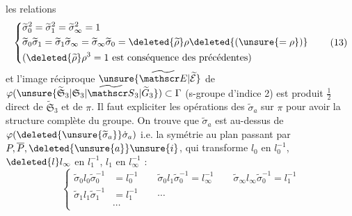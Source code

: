 les relations
\[
\left\{\begin{aligned}
&\widetilde\sigma_0^2=\widetilde\sigma_1^2=\widetilde\sigma_\infty^2=1\\
&\widetilde\sigma_0\widetilde\sigma_1=\widetilde\sigma_1\widetilde\sigma_\infty=\widetilde\sigma_\infty\widetilde\sigma_0=\deleted{\widetilde\rho}\rho\deleted{(\unsure{=\rho})}\\
&(\deleted{\widetilde\rho}\rho^3=1\text{ est conséquence des précédentes})
\end{aligned}\right.\tag*{(13)}
\]
et l'image réciproque $\unsure{\widetilde{\mathscr E}|\widetilde{\mathcal E}}$ de $\varphi(\unsure{\widetilde{\mathfrak S}_3|\mathfrak S_3|\widetilde{\mathscr S}_3|\widetilde G_3})\subset\Gamma$ (s-groupe d'indice 2) est produit $\frac12$ direct de $\widetilde{\mathfrak S}_3$ et de $\pi$. Il faut expliciter les opérations des $\widetilde\sigma_a$ sur $\pi$ pour avoir la structure complète du groupe. On trouve que $\widetilde\sigma_a$ est au-dessus de $\varphi(\deleted{\unsure{\widetilde\sigma_a}}\dot\sigma_a)$ i.e. la symétrie  au plan passant par $P,\overline P,\deleted{\unsure{a}}\unsure{i}$, qui transforme $l_0$ en $l_0^{-1}$, $\deleted{l}l_\infty$ en $l_1^{-1}$, $l_1$ en $l_\infty^{-1}$ :
\[
\left\{\begin{aligned}
\widetilde\sigma_0l_0\widetilde\sigma_0^{-1}&=l_0^{-1}\qquad
\widetilde\sigma_0l_1\widetilde\sigma_0^{-1}=l_\infty^{-1}\qquad
\widetilde\sigma_\infty l_\infty\widetilde\sigma_0^{-1}=l_1^{-1}\\
\widetilde\sigma_1l_1\widetilde\sigma_1^{-1}&=l_1^{-1}\qquad\cdots\\
&\cdots
\end{aligned}\right.\tag*{(14)}
\]

